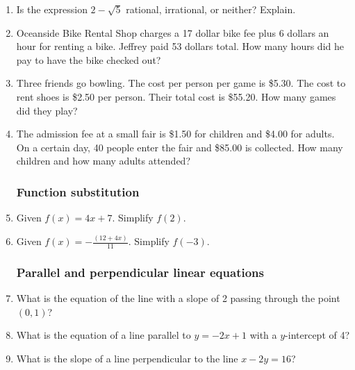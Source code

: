 \documentclass[12pt, oneside]{article}
\begin{document}
\begin{enumerate}
  \item Is the expression $2-\sqrt{5}$ rational, irrational, or neither? Explain.

\newpage
  \item Oceanside Bike Rental Shop charges a 17 dollar bike fee plus 6 dollars an hour for renting a bike. Jeffrey paid 53 dollars total. How many hours did he pay to have the bike checked out? \vspace{6cm}

  \item Three friends go bowling. The cost per person per game is \$5.30. The cost to rent shoes is \$2.50 per person. Their total cost is \$55.20. How many games did they play? \vspace{6cm}

  \item The admission fee at a small fair is \$1.50 for children and \$4.00 for adults. On a certain day, 40 people enter the fair and \$85.00 is collected. How many children and how many adults attended?

\newpage
  \subsubsection*{Function substitution}
  \item Given $f(x)=4x+7$. Simplify $f(2)$. \vspace{4cm}
  \item Given $\displaystyle f(x)=-\frac{(12+4x)}{11}$. Simplify $f(-3)$.

\newpage
\subsubsection*{Parallel and perpendicular linear equations}

  \item What is the equation of the line with a slope of 2 passing through the point $(0,1)$? \vspace{4cm}
  \item What is the equation of a line parallel to $y=-2x+1$ with a $y$-intercept of 4? \vspace{4cm}
  \item What is the slope of a line perpendicular to the line $x-2y=16$? \vspace{4cm}

\end{enumerate}
\end{document}
